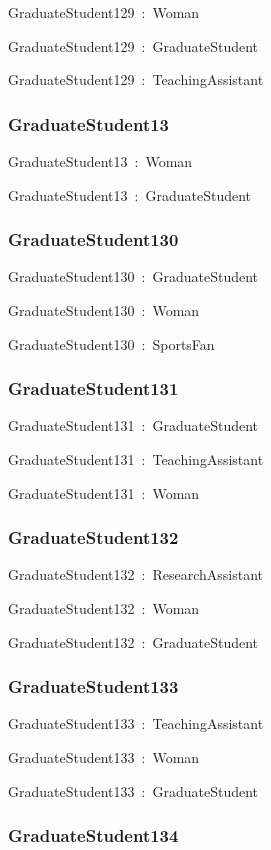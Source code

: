 \documentclass{article}
\begin{document}
GraduateStudent129~:~Woman

GraduateStudent129~:~GraduateStudent

GraduateStudent129~:~TeachingAssistant

\subsubsection*{GraduateStudent13}

GraduateStudent13~:~Woman

GraduateStudent13~:~GraduateStudent

\subsubsection*{GraduateStudent130}

GraduateStudent130~:~GraduateStudent

GraduateStudent130~:~Woman

GraduateStudent130~:~SportsFan

\subsubsection*{GraduateStudent131}

GraduateStudent131~:~GraduateStudent

GraduateStudent131~:~TeachingAssistant

GraduateStudent131~:~Woman

\subsubsection*{GraduateStudent132}

GraduateStudent132~:~ResearchAssistant

GraduateStudent132~:~Woman

GraduateStudent132~:~GraduateStudent

\subsubsection*{GraduateStudent133}

GraduateStudent133~:~TeachingAssistant

GraduateStudent133~:~Woman

GraduateStudent133~:~GraduateStudent

\subsubsection*{GraduateStudent134}
\end{document}
